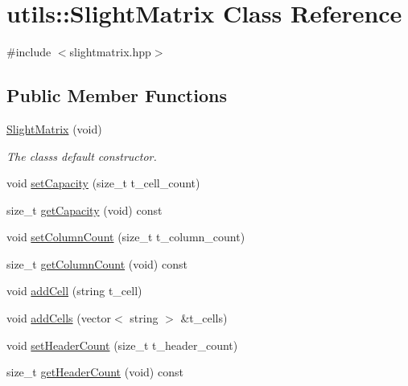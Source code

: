\hypertarget{classutils_1_1SlightMatrix}{}\section{utils\+:\+:Slight\+Matrix Class Reference}
\label{classutils_1_1SlightMatrix}


{\ttfamily \#include $<$slightmatrix.\+hpp$>$}

\subsection*{Public Member Functions}
\begin{DoxyCompactItemize}
\item 
\mbox{\label{classutils_1_1SlightMatrix_a2c2eb567ef914ecde524b3af725258fd}} 
\hyperlink{classutils_1_1SlightMatrix_a2c2eb567ef914ecde524b3af725258fd}{Slight\+Matrix} (void)
\begin{DoxyCompactList}\small\item\em The class\textquotesingle{}s default constructor. \end{DoxyCompactList}\item 
void \hyperlink{classutils_1_1SlightMatrix_a60585fa6bfe89f8fb2e477f6811c6741}{set\+Capacity} (size\+\_\+t t\+\_\+cell\+\_\+count)
\item 
size\+\_\+t \hyperlink{classutils_1_1SlightMatrix_addbfd1ec641100a7cda0b4f6e39ae676}{get\+Capacity} (void) const
\item 
void \hyperlink{classutils_1_1SlightMatrix_a0106a8dc432d51ac9248ba7920f8913a}{set\+Column\+Count} (size\+\_\+t t\+\_\+column\+\_\+count)
\item 
size\+\_\+t \hyperlink{classutils_1_1SlightMatrix_aa08a3c2d096ac82b1688b1edc5bb71fd}{get\+Column\+Count} (void) const
\item 
void \hyperlink{classutils_1_1SlightMatrix_a06f6b4d49818f6f1befea6109ad7b5f6}{add\+Cell} (string t\+\_\+cell)
\item 
void \hyperlink{classutils_1_1SlightMatrix_a9df60a5b5f534a17f025d22bb1a50e0e}{add\+Cells} (vector$<$ string $>$ \&t\+\_\+cells)
\item 
void \hyperlink{classutils_1_1SlightMatrix_a666f126473f47493d127d32133f77894}{set\+Header\+Count} (size\+\_\+t t\+\_\+header\+\_\+count)
\item 
size\+\_\+t \hyperlink{classutils_1_1SlightMatrix_ac3ba42c47509027bd1c4a07055f347b9}{get\+Header\+Count} (void) const

\end{DoxyCompactItemize}
